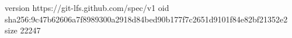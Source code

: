 version https://git-lfs.github.com/spec/v1
oid sha256:9c47b62606a7f8989300a2918d84bed90b177f7c2651d9101f84e82bf21352e2
size 22247

